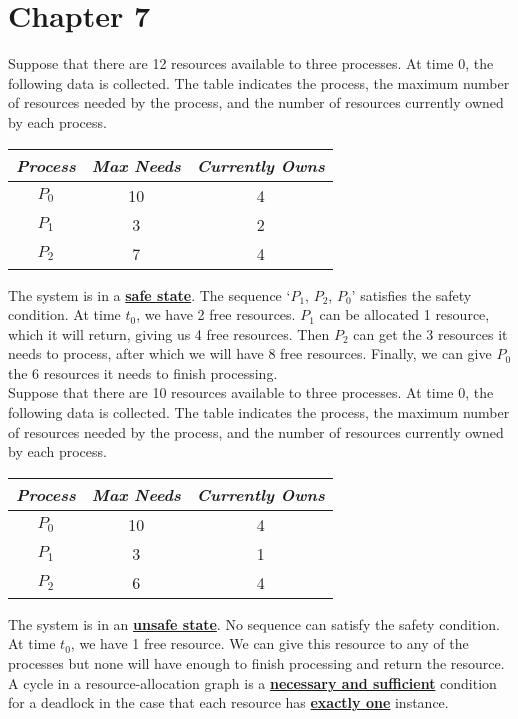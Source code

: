 \documentclass[10pt]{article}
\newcommand{\qw}[1]{\textbf{\ul{#1}}}
\begin{document}
\section*{\centering Chapter 7}
Suppose that there are 12 resources available to three processes. At time 0, the following data is collected. The table indicates the process, the maximum number of resources needed by the process, and the number of resources currently owned by each process.
\begin{table}[H]
\centering
\begin{tabular}{ccc}
\textit{Process} & \textit{Max Needs} & \textit{Currently Owns} \\ \hline
$P_0$ & 10 & 4 \\
$P_1$ & 3 & 2 \\
$P_2$ & 7 & 4 \\ \hline
\end{tabular}
\end{table}
The system is in a \qw{safe state}. The sequence `$P_1$, $P_2$, $P_0$' satisfies the safety condition.
At time $t_0$, we have 2 free resources. $P_1$ can be allocated 1 resource, 
which it will return, giving us 4 free resources. Then $P_2$ can get the 3 resources it needs to process,
after which we will have 8 free resources. Finally, we can give $P_0$ the 6 resources it needs to finish processing.\\[4mm]
Suppose that there are 10 resources available to three processes. At time 0, the following data is collected. The table indicates the process, the maximum number of resources needed by the process, and the number of resources currently owned by each process.
\begin{table}[H]
\centering
\begin{tabular}{ccc}
\textit{Process} & \textit{Max Needs} & \textit{Currently Owns} \\ \hline
$P_0$ & 10 & 4 \\
$P_1$ & 3 & 1 \\
$P_2$ & 6 & 4 \\ \hline
\end{tabular}
\end{table}
The system is in an \qw{unsafe state}. No sequence can satisfy the safety condition.
At time $t_0$, we have 1 free resource. We can give this resource to any of the processes but none
will have enough to finish processing and return the resource.\\[4mm]
A cycle in a resource-allocation graph is a \qw{necessary and sufficient} condition for a deadlock in the case that each resource has \qw{exactly one} instance.\\[2mm]
\end{document}
